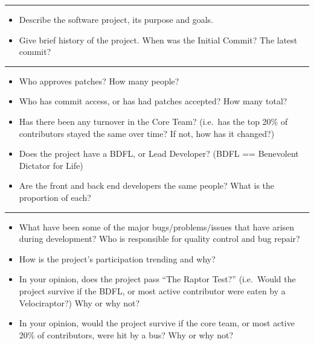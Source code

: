 \begin{center}\rule{3in}{0.4pt}\end{center}

\begin{itemize}
\itemsep1pt\parskip0pt
\item
  Describe the software project, its purpose and goals.
\item
  Give brief history of the project. When was the Initial Commit? The
  latest commit?
\end{itemize}

\begin{center}\rule{3in}{0.4pt}\end{center}

\begin{itemize}
\itemsep1pt\parskip0pt
\item
  Who approves patches? How many people?
\item
  Who has commit access, or has had patches accepted? How many total?
\item
  Has there been any turnover in the Core Team? (i.e.~has the top 20\%
  of contributors stayed the same over time? If not, how has it
  changed?)
\item
  Does the project have a BDFL, or Lead Developer? (BDFL == Benevolent
  Dictator for Life)
\item
  Are the front and back end developers the same people? What is the
  proportion of each?
\end{itemize}

\begin{center}\rule{3in}{0.4pt}\end{center}

\begin{itemize}
\itemsep1pt\parskip0pt
\item
  What have been some of the major bugs/problems/issues that have arisen
  during development? Who is responsible for quality control and bug
  repair?
\item
  How is the project's participation trending and why?
\item
  In your opinion, does the project pass ``The Raptor Test?''
  (i.e.~Would the project survive if the BDFL, or most active
  contributor were eaten by a Velociraptor?) Why or why not?
\item
  In your opinion, would the project survive if the core team, or most
  active 20\% of contributors, were hit by a bus? Why or why not?
\end{itemize}

